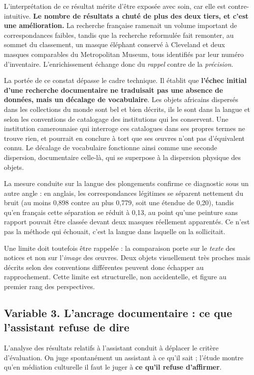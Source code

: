 L'interprétation de ce résultat mérite d'être exposée avec soin, car elle est
contre-intuitive. \textbf{Le nombre de résultats a chuté de plus des deux tiers,
et c'est une amélioration.} La recherche française ramenait un volume important
de correspondances faibles, tandis que la recherche reformulée fait
remonter, au sommet du classement, un masque éléphant conservé à Cleveland et
deux masques comparables du Metropolitan Museum, tous identifiés par leur numéro
d'inventaire. L'enrichissement échange donc du \emph{rappel} contre de la
\emph{précision}.

La portée de ce constat dépasse le cadre technique. Il établit que
\textbf{l'échec initial d'une recherche documentaire ne traduisait pas une
absence de données, mais un décalage de vocabulaire}. Les objets africains
dispersés dans les collections du monde sont bel et bien décrits, ils le sont
dans la langue et selon les conventions de catalogage des institutions qui les
conservent. Une institution camerounaise qui interroge ces catalogues dans ses
propres termes ne trouve rien, et pourrait en conclure à tort que ses œuvres
n'ont pas d'équivalent connu. Le décalage de vocabulaire fonctionne ainsi comme
une seconde dispersion, documentaire celle-là, qui se superpose à la dispersion
physique des objets.

La mesure conduite sur la langue des plongements confirme ce diagnostic sous un
autre angle : en anglais, les correspondances légitimes se séparent nettement du
bruit (au moins 0,898 contre au plus 0,779, soit une étendue de 0,20), tandis
qu'en français cette séparation se réduit à 0,13, au point qu'une peinture sans
rapport pouvait être classée devant deux masques réellement apparentés. Ce n'est
pas la méthode qui échouait, c'est la langue dans laquelle on la sollicitait.

Une limite doit toutefois être rappelée : la comparaison porte sur le
\emph{texte} des notices et non sur l'\emph{image} des œuvres. Deux objets
visuellement très proches mais décrits selon des conventions différentes peuvent
donc échapper au rapprochement. Cette limite est structurelle, non accidentelle,
et figure au premier rang des perspectives.

\subsection{Variable 3. L'ancrage documentaire : ce que l'assistant refuse de dire}

L'analyse des résultats relatifs à l'assistant conduit à déplacer le critère
d'évaluation. On juge spontanément un assistant à ce qu'il sait ; l'étude montre
qu'en médiation culturelle il faut le juger à \textbf{ce qu'il refuse
d'affirmer}.

